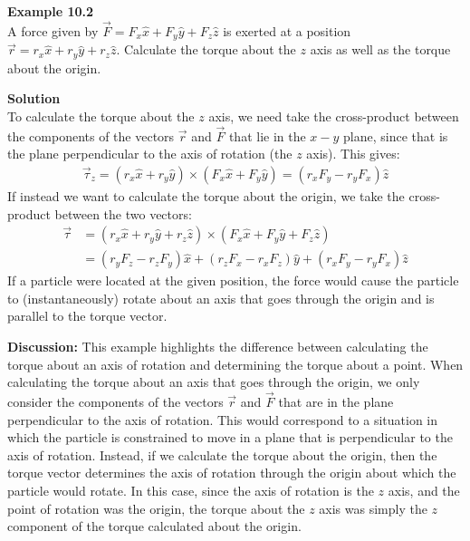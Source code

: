 \begin{framed}
\textbf{Example 10.2}\\
A force given by $\vec F=F_x\hat x + F_y \hat y + F_z \hat z$ is exerted at a position $\vec r=r_x \hat x + r_y \hat y + r_z\hat z$. Calculate the torque about the $z$ axis as well as the torque about the origin.

\begin{framed}
\textbf{Solution}\\
To calculate the torque about the $z$ axis, we need take the cross-product between the components of the vectors $\vec r$ and $\vec F$ that lie in the $x -y$ plane, since that is the plane perpendicular to the axis of rotation (the $z$ axis). This gives:
\begin{align*}
\vec\tau_z =(r_x \hat x + r_y \hat y) \times (F_x\hat x + F_y \hat y) =(r_xF_y-r_yF_x)\hat z
\end{align*}
If instead we want to calculate the torque about the origin, we take the cross-product between the two vectors:
\begin{align*}
\vec\tau &=(r_x \hat x + r_y \hat y+ r_z\hat z) \times (F_x\hat x + F_y \hat y+ F_z \hat z)\\
&=(r_yF_z-r_zF_y)\hat x+(r_zF_x-r_xF_z)\hat y+(r_xF_y-r_yF_x)\hat z
\end{align*}
If a particle were located at the given position, the force would cause the particle to (instantaneously) rotate about an axis that goes through the origin and is parallel to the torque vector.

\textbf{Discussion:} This example highlights the difference between calculating the torque about an axis of rotation and determining the torque about a point. When calculating the torque about an axis that goes through the origin, we only consider the components of the vectors $\vec r$ and $\vec F$ that are in the plane perpendicular to the axis of rotation. This would correspond to a situation in which the particle is constrained to move in a plane that is perpendicular to the axis of rotation. Instead, if we calculate the torque about the origin, then the torque vector determines the axis of rotation through the origin about which the particle would rotate. In this case, since the axis of rotation is the $z$ axis, and the point of rotation was the origin, the torque about the $z$ axis was simply the $z$ component of the torque calculated about the origin.
\end{framed}
\end{framed}

